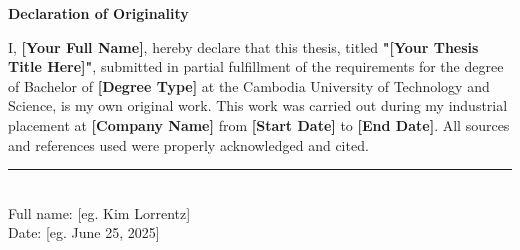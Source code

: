 \thispagestyle{empty}

\begin{center}
    {\huge\bfseries Declaration of Originality}
\end{center}
\vspace{1 cm}
I, \textbf{[Your Full Name]}, hereby declare that this thesis, titled \textbf{"[Your Thesis Title Here]"}, submitted in partial fulfillment of the requirements for the degree of Bachelor of \textbf{[Degree Type]} at the Cambodia University of Technology and Science, is my own original work. This work was carried out during my industrial placement at \textbf{[Company Name]} from \textbf{[Start Date]} to \textbf{[End Date]}. All sources and references used were properly acknowledged and cited.
\vspace{3cm} %


\noindent\rule{6cm}{0.4pt} \\[0.1cm]
Full name\hspace*{1.05cm}:  [eg. Kim Lorrentz] \\
Date\hspace*{2cm}: [eg. June 25, 2025]
